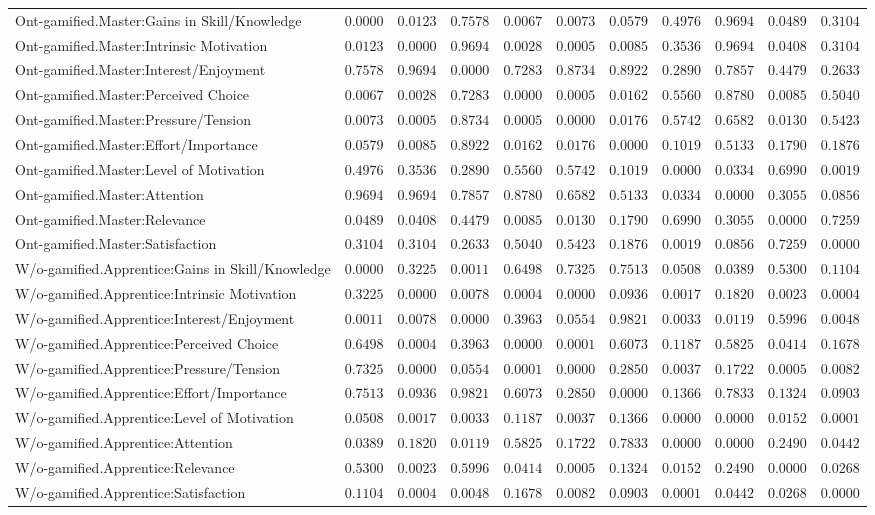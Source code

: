 \begin{landscape}
{\begin{longtable}{lrrrrrrrrrr}
Ont-gamified.Master:Gains in Skill/Knowledge&$0.0000$&$0.0123$&$0.7578$&$0.0067$&$0.0073$&$0.0579$&$0.4976$&$0.9694$&$0.0489$&$0.3104$\tabularnewline
Ont-gamified.Master:Intrinsic Motivation&$0.0123$&$0.0000$&$0.9694$&$0.0028$&$0.0005$&$0.0085$&$0.3536$&$0.9694$&$0.0408$&$0.3104$\tabularnewline
Ont-gamified.Master:Interest/Enjoyment&$0.7578$&$0.9694$&$0.0000$&$0.7283$&$0.8734$&$0.8922$&$0.2890$&$0.7857$&$0.4479$&$0.2633$\tabularnewline
Ont-gamified.Master:Perceived Choice&$0.0067$&$0.0028$&$0.7283$&$0.0000$&$0.0005$&$0.0162$&$0.5560$&$0.8780$&$0.0085$&$0.5040$\tabularnewline
Ont-gamified.Master:Pressure/Tension&$0.0073$&$0.0005$&$0.8734$&$0.0005$&$0.0000$&$0.0176$&$0.5742$&$0.6582$&$0.0130$&$0.5423$\tabularnewline
Ont-gamified.Master:Effort/Importance&$0.0579$&$0.0085$&$0.8922$&$0.0162$&$0.0176$&$0.0000$&$0.1019$&$0.5133$&$0.1790$&$0.1876$\tabularnewline
Ont-gamified.Master:Level of Motivation&$0.4976$&$0.3536$&$0.2890$&$0.5560$&$0.5742$&$0.1019$&$0.0000$&$0.0334$&$0.6990$&$0.0019$\tabularnewline
Ont-gamified.Master:Attention&$0.9694$&$0.9694$&$0.7857$&$0.8780$&$0.6582$&$0.5133$&$0.0334$&$0.0000$&$0.3055$&$0.0856$\tabularnewline
Ont-gamified.Master:Relevance&$0.0489$&$0.0408$&$0.4479$&$0.0085$&$0.0130$&$0.1790$&$0.6990$&$0.3055$&$0.0000$&$0.7259$\tabularnewline
Ont-gamified.Master:Satisfaction&$0.3104$&$0.3104$&$0.2633$&$0.5040$&$0.5423$&$0.1876$&$0.0019$&$0.0856$&$0.7259$&$0.0000$\tabularnewline
\hline


W/o-gamified.Apprentice:Gains in Skill/Knowledge&$0.0000$&$0.3225$&$0.0011$&$0.6498$&$0.7325$&$0.7513$&$0.0508$&$0.0389$&$0.5300$&$0.1104$\tabularnewline
W/o-gamified.Apprentice:Intrinsic Motivation&$0.3225$&$0.0000$&$0.0078$&$0.0004$&$0.0000$&$0.0936$&$0.0017$&$0.1820$&$0.0023$&$0.0004$\tabularnewline
W/o-gamified.Apprentice:Interest/Enjoyment&$0.0011$&$0.0078$&$0.0000$&$0.3963$&$0.0554$&$0.9821$&$0.0033$&$0.0119$&$0.5996$&$0.0048$\tabularnewline
W/o-gamified.Apprentice:Perceived Choice&$0.6498$&$0.0004$&$0.3963$&$0.0000$&$0.0001$&$0.6073$&$0.1187$&$0.5825$&$0.0414$&$0.1678$\tabularnewline
W/o-gamified.Apprentice:Pressure/Tension&$0.7325$&$0.0000$&$0.0554$&$0.0001$&$0.0000$&$0.2850$&$0.0037$&$0.1722$&$0.0005$&$0.0082$\tabularnewline
W/o-gamified.Apprentice:Effort/Importance&$0.7513$&$0.0936$&$0.9821$&$0.6073$&$0.2850$&$0.0000$&$0.1366$&$0.7833$&$0.1324$&$0.0903$\tabularnewline
W/o-gamified.Apprentice:Level of Motivation&$0.0508$&$0.0017$&$0.0033$&$0.1187$&$0.0037$&$0.1366$&$0.0000$&$0.0000$&$0.0152$&$0.0001$\tabularnewline
W/o-gamified.Apprentice:Attention&$0.0389$&$0.1820$&$0.0119$&$0.5825$&$0.1722$&$0.7833$&$0.0000$&$0.0000$&$0.2490$&$0.0442$\tabularnewline
W/o-gamified.Apprentice:Relevance&$0.5300$&$0.0023$&$0.5996$&$0.0414$&$0.0005$&$0.1324$&$0.0152$&$0.2490$&$0.0000$&$0.0268$\tabularnewline
W/o-gamified.Apprentice:Satisfaction&$0.1104$&$0.0004$&$0.0048$&$0.1678$&$0.0082$&$0.0903$&$0.0001$&$0.0442$&$0.0268$&$0.0000$\tabularnewline
\hline



\end{longtable}}
\end{landscape}
